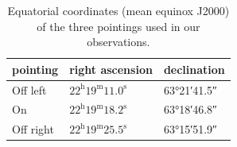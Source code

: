 \begin{table}[b]
%
    \centering
    \begin{tabular}{lll}
        \toprule
        pointing  & right ascension & declination \\
        \midrule
        Off left  & $22^\text{h}19^\text{m}11.0^\text{s}$ & \ang{63;21;41.5}\\
        On        & $22^\text{h}19^\text{m}18.2^\text{s}$ & \ang{63;18;46.8}\\
        Off right & $22^\text{h}19^\text{m}25.5^\text{s}$ & \ang{63;15;51.9}\\
        \bottomrule
    \end{tabular}
    \caption{Equatorial coordinates (mean equinox J2000) of the three pointings used in our observations.}
    \label{tab:on_off_positions}
\end{table}

